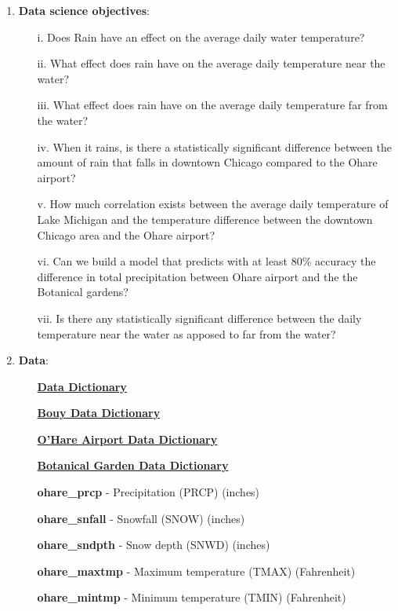 \documentclass[10pt]{article}
\begin{document}
\begin{enumerate}[\null]

\item \textbf{Data science objectives}:
\begin{enumerate}
\item[i.] Does Rain have an effect on the average daily water temperature?
\item[ii.] What effect does rain have on the average daily temperature near the water?
\item[iii.] What effect does rain have on the average daily temperature far from the water?
\item[iv.] When it rains, is there a statistically significant difference between the amount of rain that falls in downtown Chicago compared to the Ohare airport?
\item[v.] How much correlation exists between the average daily temperature of Lake Michigan and the temperature difference between the downtown Chicago area and the Ohare airport?
\item[vi.] Can we build a model that predicts with at least 80\% accuracy the difference in total precipitation between Ohare airport and the the Botanical gardens?
\item[vii.] Is there any statistically significant difference between the daily temperature near the water as apposed to far from the water?
\end{enumerate}
 


\item \textbf{Data}: 

\begin{enumerate}
\item[] \href{}{\textbf{Data Dictionary}}
\item[] \href{https://www.ndbc.noaa.gov/measdes.shtml}{\textbf{Bouy Data Dictionary}}
\item[] \href{https://www1.ncdc.noaa.gov/pub/data/ghcn/daily/readme.txt}{\textbf{O'Hare Airport Data Dictionary}}
\item[] \href{https://www1.ncdc.noaa.gov/pub/data/ghcn/daily/readme.txt}{\textbf{Botanical Garden Data Dictionary}}

\end{enumerate}

\begin{enumerate}
 \item[] \textbf{ohare\_prcp} - Precipitation (PRCP) (inches)
 \item[] \textbf{ohare\_snfall} - Snowfall (SNOW) (inches)
 \item[] \textbf{ohare\_sndpth} - Snow depth (SNWD) (inches) 
 \item[] \textbf{ohare\_maxtmp} - Maximum temperature (TMAX) (Fahrenheit)
 \item[] \textbf{ohare\_mintmp} - Minimum temperature (TMIN) (Fahrenheit)
\end{enumerate}


\end{enumerate}
\end{document}

